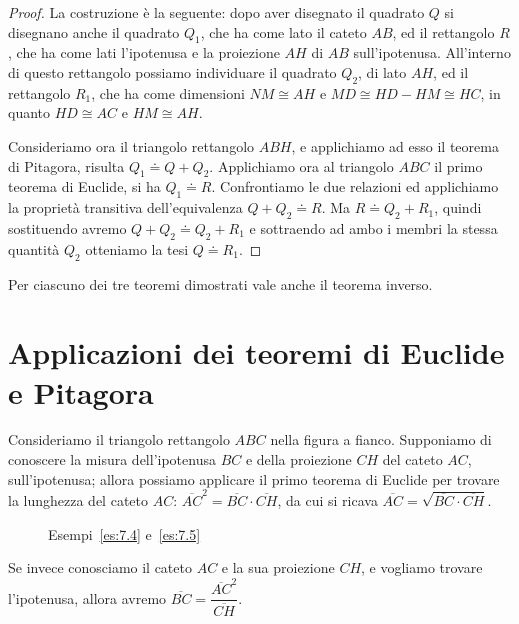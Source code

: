 \noindent\begin{minipage}{0.6\textwidth}\parindent15pt
\begin{proof}

La costruzione è la seguente: dopo aver disegnato il quadrato \(Q\) si 
disegnano anche il quadrato \(Q_1\), che ha come lato il cateto \(AB\), 
ed il rettangolo \(R\), che ha come lati l'ipotenusa e la proiezione 
\(AH\) di \(AB\) sull'ipotenusa. All'interno di questo rettangolo 
possiamo individuare il quadrato \(Q_2\), di lato \(AH\), ed il rettangolo 
\(R_1\), che ha come dimensioni \(NM\cong AH\) e \(MD\cong HD-HM\cong HC\), 
in quanto \(HD\cong AC\) e \(HM\cong AH\).

Consideriamo ora il triangolo rettangolo \(ABH\), e applichiamo ad esso 
il teorema di Pitagora, risulta \(Q_1\doteq Q+Q_2\). Applichiamo ora al 
triangolo \(ABC\) il primo teorema di Euclide, si ha \(Q_1\doteq R\). 
Confrontiamo le due relazioni ed applichiamo la proprietà transitiva 
dell'equivalenza \(Q+Q_2\doteq R\). Ma \(R\doteq Q_2 + R_1\), quindi 
sostituendo avremo \(Q+Q_2\doteq Q_2 + R_1\) e sottraendo ad ambo i 
membri la stessa quantità \(Q_2\) otteniamo la tesi \(Q\doteq R_1\).
\end{proof}
\end{minipage}\hfil
\begin{minipage}{0.4\textwidth}
  \centering
\end{minipage}\vspace{8pt}

Per ciascuno dei tre teoremi dimostrati vale anche il teorema inverso.


\section{Applicazioni dei teoremi di Euclide e Pitagora}
\label{sect:applicazioni_pitagora_euclide}

Consideriamo il triangolo rettangolo \(ABC\) nella figura a fianco.
Supponiamo di conoscere la misura dell'ipotenusa \(BC\) e della 
proiezione \(CH\) del cateto \(AC\), sull'ipotenusa; allora possiamo 
applicare il primo teorema di Euclide per trovare la lunghezza del 
cateto \(AC\): \(\overline{AC}^2=\overline{BC}\cdot \overline{CH}\), da 
cui si ricava \(\overline{AC}=\sqrt{\overline{BC}\cdot \overline{CH}}\).

\begin{wrapfigure}{r}{0.25\textwidth}
  \centering
  \caption{Esempi~\ref{es:7.4} e~\ref{es:7.5}}\label{fig:es7.4}
\end{wrapfigure}
Se invece conosciamo il cateto \(AC\) e la sua 
proiezione \(CH\), e vogliamo trovare l'ipotenusa, allora avremo 
\(\overline{BC}=\dfrac{\overline{AC}^2}{\overline{CH}}\).

